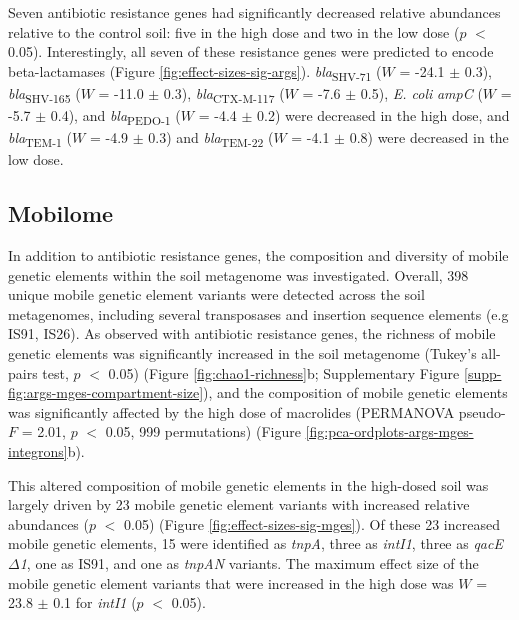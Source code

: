 Seven antibiotic resistance genes had significantly decreased relative abundances relative to the control soil: five in the high dose and two in the low dose ($p$ $<$ 0.05).
Interestingly, all seven of these resistance genes were predicted to encode beta-lactamases (Figure \ref{fig:effect-sizes-sig-args}).
\textit{bla}\textsubscript{SHV-71} ($W$ = -24.1 $\pm$ 0.3), \textit{bla}\textsubscript{SHV-165} ($W$ = -11.0 $\pm$ 0.3), \textit{bla}\textsubscript{CTX-M-117} ($W$ = -7.6 $\pm$ 0.5), \textit{E. coli} \textit{ampC} ($W$ = -5.7 $\pm$ 0.4), and \textit{bla}\textsubscript{PEDO-1} ($W$ = -4.4 $\pm$ 0.2) were decreased in the high dose, and \textit{bla}\textsubscript{TEM-1} ($W$ = -4.9 $\pm$ 0.3) and \textit{bla}\textsubscript{TEM-22} ($W$ = -4.1 $\pm$ 0.8) were decreased in the low dose.

\subsection{Mobilome}

In addition to antibiotic resistance genes, the composition and diversity of mobile genetic elements within the soil metagenome was investigated.
Overall, 398 unique mobile genetic element variants were detected across the soil metagenomes, including several transposases and insertion sequence elements (e.g IS91, IS26).
As observed with antibiotic resistance genes, the richness of mobile genetic elements was significantly increased in the soil metagenome (Tukey’s all-pairs test, $p$ $<$ 0.05) (Figure \ref{fig:chao1-richness}b; Supplementary Figure \ref{supp-fig:args-mges-compartment-size}), and the composition of mobile genetic elements was significantly affected by the high dose of macrolides (PERMANOVA pseudo-$F$ = 2.01, $p$ $<$ 0.05, 999 permutations) (Figure \ref{fig:pca-ordplots-args-mges-integrons}b).

This altered composition of mobile genetic elements in the high-dosed soil was largely driven by 23 mobile genetic element variants with increased relative abundances ($p$ $<$ 0.05) (Figure \ref{fig:effect-sizes-sig-mges}).
Of these 23 increased mobile genetic elements, 15 were identified as \textit{tnpA}, three as \textit{intI1}, three as \textit{qacE$\Delta$1}, one as IS91, and one as \textit{tnpAN} variants.
The maximum effect size of the mobile genetic element variants that were increased in the high dose was $W$ = 23.8 $\pm$ 0.1 for \textit{intI1} ($p$ $<$ 0.05).

